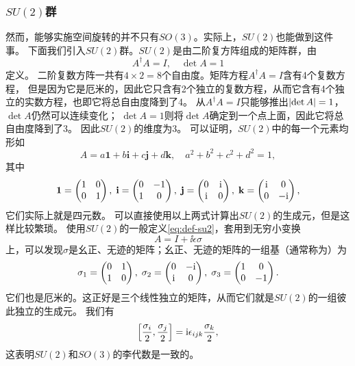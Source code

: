 \subsubsection{$SU(2)$群}

然而，能够实施空间旋转的并不只有$SO(3)$。实际上，$SU(2)$也能做到这件事。
下面我们引入$SU(2)$群。$SU(2)$是由二阶复方阵组成的矩阵群，由
\begin{equation}
    A^\dagger A = I, \quad \det A = 1
    \label{eq:def-su2}
\end{equation}
定义。
二阶复数方阵一共有$4 \times 2 = 8$个自由度。矩阵方程$A^\dagger A = I$含有4个复数方程，
但是因为它是厄米的，因此它只含有2个独立的复数方程，从而它含有4个独立的实数方程，也即它将总自由度降到了4。
从$A^\dagger A = I$只能够推出$\abs{\det A} = 1$，$\det A$仍然可以连续变化；
$\det A = 1$则将$\det A$确定到一个点上面，因此它将总自由度降到了3。
因此$SU(2)$的维度为3。
可以证明，$SU(2)$中的每一个元素均形如
\begin{equation}
    A = a \mathbf{1} + b \mathbf{i} + c \mathbf{j} + d \mathbf{k}, \quad a^2 + b^2 + c^2 + d^2 = 1,
    \label{eq:su2-expression}
\end{equation}
其中
\begin{equation}
    \mathbf{1} = \pmqty{1 & 0 \\ 0 & 1}, \; \mathbf{i} = \pmqty{0 & -1 \\ 1 & 0}, \; 
    \mathbf{j} = \pmqty{0 & \ii \\ \ii & 0}, \; \mathbf{k} = \pmqty{\ii & 0 \\ 0 & -\ii},
    \label{eq:quad-basis}
\end{equation}
它们实际上就是四元数。
可以直接使用以上两式计算出$SU(2)$的生成元，但是这样比较繁琐。
使用$SU(2)$的一般定义\eqref{eq:def-su2}，套用到无穷小变换
\[
    A = I + \ii \epsilon \sigma
\]
上，可以发现$\sigma$是幺正、无迹的矩阵；幺正、无迹的矩阵的一组基（通常称为）为
\begin{equation}
    \sigma_1 = \pmqty{0 & 1 \\ 1 & 0}, \; \sigma_2 = \pmqty{0 & -\ii \\ \ii & 0}, \; \sigma_3 = \pmqty{1 & 0 \\ 0 & -1}.
    \label{eq:sigma-matrix}
\end{equation}
它们也是厄米的。这正好是三个线性独立的矩阵，从而它们就是$SU(2)$的一组彼此独立的生成元。
我们有
\begin{equation}
    \comm{\frac{\sigma_i}{2}}{\frac{\sigma_j}{2}} = \ii \epsilon_{ijk} \frac{\sigma_k}{2},
\end{equation}
这表明$SU(2)$和$SO(3)$的李代数是一致的。

